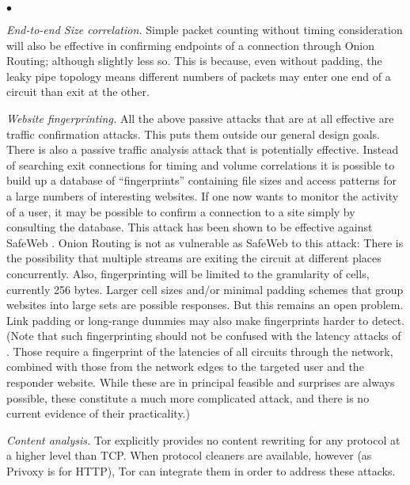 \documentclass[times,10pt,twocolumn]{article}
\newenvironment{tightlist}{\begin{list}{$\bullet$}{
  \setlength{\itemsep}{0mm}
    \setlength{\parsep}{0mm}
    }}{\end{list}}
\begin{document}
\begin{tightlist}
\item \emph{End-to-end Size correlation.} Simple packet counting
  without timing consideration will also be effective in confirming
  endpoints of a connection through Onion Routing; although slightly
  less so. This is because, even without padding, the leaky pipe
  topology means different numbers of packets may enter one end of a
  circuit than exit at the other.
  
\item \emph{Website fingerprinting.} All the above passive
  attacks that are at all effective are traffic confirmation attacks.
  This puts them outside our general design goals. There is also
  a passive traffic analysis attack that is potentially effective.
  Instead of searching exit connections for timing and volume
  correlations it is possible to build up a database of
  ``fingerprints'' containing file sizes and access patterns for a
  large numbers of interesting websites. If one now wants to
  monitor the activity of a user, it may be possible to confirm a
  connection to a site simply by consulting the database. This attack has
  been shown to be effective against SafeWeb \cite{hintz-pet02}. Onion
  Routing is not as vulnerable as SafeWeb to this attack: There is the
  possibility that multiple streams are exiting the circuit at
  different places concurrently.  Also, fingerprinting will be limited to
  the granularity of cells, currently 256 bytes. Larger cell sizes
  and/or minimal padding schemes that group websites into large sets
  are possible responses.  But this remains an open problem.  Link
  padding or long-range dummies may also make fingerprints harder to
  detect. (Note that
  such fingerprinting should not be confused with the latency attacks
  of \cite{back01}. Those require a fingerprint of the latencies of
  all circuits through the network, combined with those from the
  network edges to the targeted user and the responder website. While
  these are in principal feasible and surprises are always possible,
  these constitute a much more complicated attack, and there is no
  current evidence of their practicality.)

\item \emph{Content analysis.}  Tor explicitly provides no content
  rewriting for any protocol at a higher level than TCP.  When
  protocol cleaners are available, however (as Privoxy is for HTTP),
  Tor can integrate them in order to address these attacks.

\end{tightlist}
\end{document}

